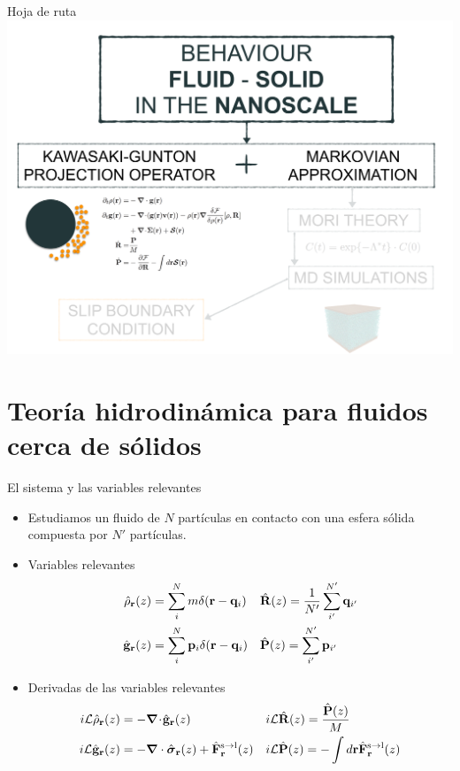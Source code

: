 \documentclass{beamer}
\newcommand{\esc}{\!\cdot\!}
\begin{document}
\begin{frame}{Hoja de ruta}
  \includegraphics[width=\linewidth]{scheme-thesis-kawasaki}
\end{frame}

\section{Teoría hidrodinámica para fluidos cerca de sólidos}
\begin{frame}{El sistema y las variables relevantes}
  \begin{itemize}
    \item<1-> Estudiamos un fluido de $N$ partículas en contacto con una esfera sólida compuesta por $N'$ partículas.
    \item<2-> Variables relevantes
      \begin{align}
        \hat{\rho}_{\bf r}(z) &=\sum^{N}_im\delta({\bf r}-{\bf q}_i)
      &&\hat{\bf R}(z)=\frac{1}{N'}\sum_{i'}^{N'}{\bf q}_{i'}
      \nonumber\\
        \hat{\bf g}_{\bf r}(z) &=\sum^{N}_i{\bf p}_i\delta({\bf r}-{\bf q}_i)
      &&\hat{\bf P}(z)=\sum_{i'}^{N'}{\bf p}_{i'}
      \nonumber
      \end{align}
    \item<3-> Derivadas de las variables relevantes
      \begin{align}
        i{\cal L} \hat{\rho}_{\bf r}(z) &= -\boldsymbol{\nabla}\esc\hat{\bf g}_{\bf r}(z)
        && i{\cal L}\hat{\bf R}(z) =\frac{\hat{\bf P}(z)}{M}
      \nonumber\\
      i{\cal L}\hat{\bf g}_{\bf r}(z)
          &=-\boldsymbol{\nabla}\cdot \hat{\boldsymbol{\sigma}}_{\bf r}(z)+\hat{{\bf F}}^{\rm s\to l}_{\bf r}(z) 
        &&i{\cal L}\hat{\bf P}(z) =-\int  d{\bf r} \hat{\bf F}^{\rm s\to l}_{\bf r}(z)
         \nonumber
\end{align}
    \end{itemize}
\end{frame}
\end{document}
